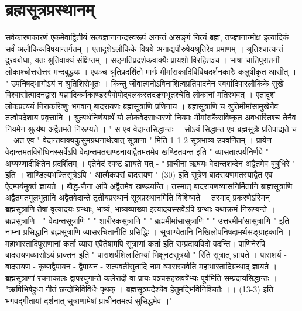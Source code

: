 \chapter{ब्रह्मसूत्रप्रस्थानम् }
सर्वकारणकारणं एकमेवाद्वितीयं सत्यज्ञानानन्दस्वरूपं अनन्तं असङ्गं नित्यं ब्रह्म, तज्ज्ञानान्मोक्ष इत्यादिकं सर्वं अलौकिकविषयान्तर्गतम् । एतादृशेऽलौकिके विषये अनाद्यपौरुषेयश्रुतिरेव प्रमाणम् । श्रुतिश्चात्यन्तं दुरवबोधा, यतः श्रुतिवाक्यं संक्षिप्तम् । सङ्गतिप्रदर्शकवाक्यैः प्रायशो विरहितञ्च । भाषा चातिपुरातनी । लोकाश्चोत्तरोत्तरं मन्दबुद्धयः । एवञ्च श्रुतिप्रदर्शितो मार्गः मीमांसकादिविविधदर्शनकारैः कलुषीकृत आसीत् । " उपनिषद्भागोऽयं न श्रुतिशिरोभूतः । किन्तु जीवात्मनोऽविनाशित्वप्रतिपादनेन स्वर्गादिपारलौकिके सुखे विश्वासोत्पादनद्वारा यज्ञादिकर्मकाण्डस्यैवोपोद्बलकस्तदङ्गभूतश्चेति लोकानां मतिरभवत् । एतादृशं लोकप्रत्ययं निराकरिष्णुः भगवान् बादरायणः ब्रह्मसूत्राणि प्रणिनाय । ब्रह्मसूत्राणि च श्रुतिमीमांसामुखेनैव तत्वोपदेशाय प्रवृत्तानि । श्रुत्यर्थनिर्णयार्थं यो लोकवेदसाधारणो नियमः मीमांसकैराविष्कृत अवधारितश्च तेनैव नियमेन श्रुर्त्यथ अद्वैतमते निरूप्यते । " स एव वेदान्तसिद्धान्तः । सोऽयं सिद्धान्त एव ब्रह्मसूत्रैः प्रतिपाद्यते च । अत एव " वेदान्तवाक्यकुसुमग्रथनार्थत्वात् सूत्राणा " मिति 1-1-2 सूत्रभाष्य उपवर्णितम् । प्रायेण वेदान्तमतविरोधिनस्सर्वेऽपि वेदान्तमतखण्डनायाद्वैतमतमेव खण्डितवन्त इति " व्यासतात्पर्यनिर्णये " अय्यण्णादीक्षितेन प्रदर्शितम् । एतेनेदं स्पष्टं ज्ञायते यत् - " प्राचीना ऋषयः वेदान्तशब्देन अद्वैतमेव बुबुधिरे " इति । शाण्डिल्यभक्तिसूत्रेऽपि  " आत्मैकपरां बादरायण " (30) इति सूत्रेण बादरायणमतस्याद्वैत एव ऐदम्पर्यमुक्तं ज्ञायते । बौद्ध-जैना अपि अद्वैतमेव खण्डयन्ति। तस्मात् बादरायणव्यासनिर्मितानि ब्राह्मसूत्राणि अद्वैतमतमूलभूतानि अद्वैतवेदान्ते तृतीयप्रस्थानं सूत्रप्रस्थानमिति विशिष्यते । तस्माद् प्रकरणेऽस्मिन् ब्रह्मसूत्राणि तेषां वृत्यादयः ग्रन्थाः, भाष्यं, भाष्यव्याख्या इत्यादयस्सर्वेऽपि ग्रन्थाः यथाक्रमं निरूप्यन्ते । 
ब्रह्मसूत्राणि - 
" वेदान्तसूत्राणि " " शारीरकसूत्राणि " " ब्रह्ममीमांसासूत्राणि " " उत्तरमीमांसासूत्राणि " इति नाम्ना प्रसिद्धानि ब्रह्मसूत्राणि व्यासरचितानीति प्रसिद्धिः । सूत्राण्येतानि निखिलोपनिषदामर्थसङ्ग्राहकानि । महाभारतादिपुराणानां कर्ता व्यास एवैतेषामपि सूत्राणां कर्ता इति सम्प्रदायविदो वदन्ति। पाणिनेरपि बादरायणव्यासोऽयं प्राक्तन इति " पाराशर्यशिलालिभ्यां भिक्षुनटसूत्रयो " रिति सूत्रात् ज्ञायते । पाराशर्य - बादरायण - कृष्णद्वैपायन - द्वैपायन - सत्यवतीसुतादि नाम व्यासस्यवेति महाभारतादिग्रन्थाद् ज्ञायते । ब्रह्मसूत्राणां रचनाकालः द्वापरयुगान्ते कलेरादौ वा प्रायः पञ्चसहस्रवर्षेभ्यः पूर्वमिति सम्प्रदायसिद्धान्तः । "ऋषिभिर्बहुधा गीतं छन्दोभिर्विविधैः पृथक् । ब्रह्मसूत्रपदैश्चैव हेतुमद्भिर्विनिश्चितैः ।। (13-3) इति भगवद्गीतायां दर्शनात् सूत्राणामेषां प्राचीनतमत्वं सुसिद्धमेव ।"
